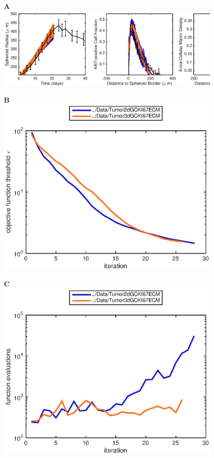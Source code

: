 \documentclass[10pt,letterpaper]{article}
\begin{document}
\begin{figure}[p]
\begin{adjustwidth}{-2in}{0in} %
\begin{center}
\textbf{A} \\ \includegraphics[width=1.3\textwidth]{Data/TumorXXXdGCKI67ECMfit}
\begin{minipage}[t]{0.65\textwidth}
\textbf{B} \\ \includegraphics[width=\textwidth]{Data/TumorXXXdGCKI67ECMobjectiveFunction}
\end{minipage}
\begin{minipage}[t]{0.65\textwidth}
\textbf{C} \\ \includegraphics[width=\textwidth]{Data/TumorXXXdGCKI67ECMfunctionEvaluations}

\end{minipage}
\end{center}
\end{adjustwidth}
\end{figure}
\end{document}
